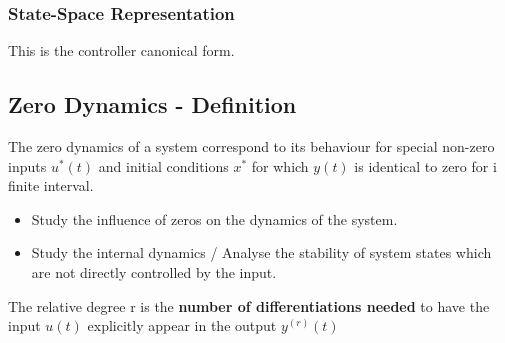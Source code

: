 \documentclass[10pt,a4paper]{scrartcl}
\begin{document}
\begin{multicols*}{3}
\subsubsection{State-Space Representation}


This is the controller canonical form.

\subsection{Zero Dynamics - Definition}

The zero dynamics of a system correspond to its behaviour for special non-zero inputs $u^\ast(t)$ and initial conditions $x^\ast$ for which $y(t)$ is identical to zero for i finite interval.

\begin{itemize}
\ncompaq
\item Study the influence of zeros on the dynamics of the system.
\item Study the internal dynamics / Analyse the stability of system states which are not directly controlled by the input.
\end{itemize}

The relative degree r is the \textbf{number of differentiations needed} to have the input $u(t)$ explicitly appear in the output $y^{(r)}(t)$



\end{multicols*}
\end{document}
